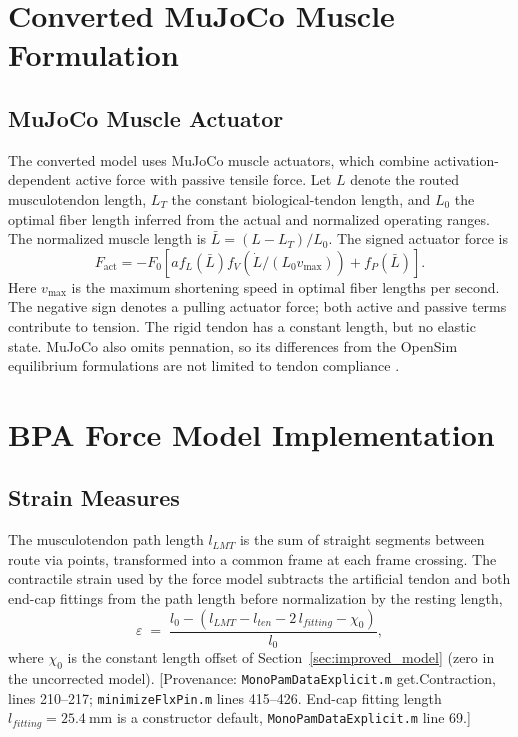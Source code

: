 \section{Converted MuJoCo Muscle Formulation}
\label{sec:muscle-models}

\subsection{MuJoCo Muscle Actuator}

The converted model uses MuJoCo muscle actuators, which combine activation-dependent active force with passive tensile force. Let $L$ denote the routed musculotendon length, $L_T$ the constant biological-tendon length, and $L_0$ the optimal fiber length inferred from the actual and normalized operating ranges. The normalized muscle length is $\bar L=(L-L_T)/L_0$. The signed actuator force is
\begin{equation}
 F_{\mathrm{act}}=-F_0\left[a f_L(\bar L)f_V(\dot L/(L_0v_{\max}))+f_P(\bar L)\right].
 \label{eq:mj-muscle}
\end{equation}
Here $v_{\max}$ is the maximum shortening speed in optimal fiber lengths per second. The negative sign denotes a pulling actuator force; both active and passive terms contribute to tension. The rigid tendon has a constant length, but no elastic state. MuJoCo also omits pennation, so its differences from the OpenSim equilibrium formulations are not limited to tendon compliance \citep{mujoco_muscle_docs_237}.

\section{BPA Force Model Implementation}

\subsection{Strain Measures}
The musculotendon path length $l_{LMT}$ is the sum of straight segments between route via points, transformed into a common frame at each frame crossing. The contractile strain used by the force model subtracts the artificial tendon and both end-cap fittings from the path length before normalization by the resting length,
\begin{equation}
    \varepsilon \;=\; \frac{l_{0} - \left(l_{LMT} - l_{ten} - 2\,l_{fitting} - \chi_{0}\right)}{l_{0}},
    \label{eq:app_strain}
\end{equation}
where $\chi_{0}$ is the constant length offset of Section~\ref{sec:improved_model} (zero in the uncorrected model). [Provenance: \texttt{MonoPamDataExplicit.m} get.Contraction, lines 210--217; \texttt{minimizeFlxPin.m} lines 415--426. End-cap fitting length $l_{fitting}=\qty{25.4}{\mm}$ is a constructor default, \texttt{MonoPamDataExplicit.m} line 69.]

